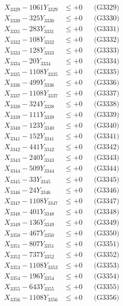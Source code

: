 \documentclass[a4paper,10pt]{article}
\begin{document}
{\begin{align}
X_{3329} - 1061Y_{3329} &\leq +0 && \text{(G3329)} \\
X_{3330} - 325Y_{3330} &\leq +0 && \text{(G3330)} \\
\allowbreak
X_{3331} - 283Y_{3331} &\leq +0 && \text{(G3331)} \\
X_{3332} - 108Y_{3332} &\leq +0 && \text{(G3332)} \\
X_{3333} - 128Y_{3333} &\leq +0 && \text{(G3333)} \\
X_{3334} - 20Y_{3334} &\leq +0 && \text{(G3334)} \\
X_{3335} - 1108Y_{3335} &\leq +0 && \text{(G3335)} \\
X_{3336} - 499Y_{3336} &\leq +0 && \text{(G3336)} \\
X_{3337} - 1108Y_{3337} &\leq +0 && \text{(G3337)} \\
X_{3338} - 324Y_{3338} &\leq +0 && \text{(G3338)} \\
X_{3339} - 111Y_{3339} &\leq +0 && \text{(G3339)} \\
X_{3340} - 123Y_{3340} &\leq +0 && \text{(G3340)} \\
\allowbreak
X_{3341} - 152Y_{3341} &\leq +0 && \text{(G3341)} \\
X_{3342} - 441Y_{3342} &\leq +0 && \text{(G3342)} \\
X_{3343} - 240Y_{3343} &\leq +0 && \text{(G3343)} \\
X_{3344} - 509Y_{3344} &\leq +0 && \text{(G3344)} \\
X_{3345} - 33Y_{3345} &\leq +0 && \text{(G3345)} \\
X_{3346} - 24Y_{3346} &\leq +0 && \text{(G3346)} \\
X_{3347} - 1108Y_{3347} &\leq +0 && \text{(G3347)} \\
X_{3348} - 401Y_{3348} &\leq +0 && \text{(G3348)} \\
X_{3349} - 136Y_{3349} &\leq +0 && \text{(G3349)} \\
X_{3350} - 467Y_{3350} &\leq +0 && \text{(G3350)} \\
\allowbreak
X_{3351} - 807Y_{3351} &\leq +0 && \text{(G3351)} \\
X_{3352} - 737Y_{3352} &\leq +0 && \text{(G3352)} \\
X_{3353} - 1108Y_{3353} &\leq +0 && \text{(G3353)} \\
X_{3354} - 196Y_{3354} &\leq +0 && \text{(G3354)} \\
X_{3355} - 643Y_{3355} &\leq +0 && \text{(G3355)} \\
X_{3356} - 1108Y_{3356} &\leq +0 && \text{(G3356)} \\

\end{align}}
\end{document}
